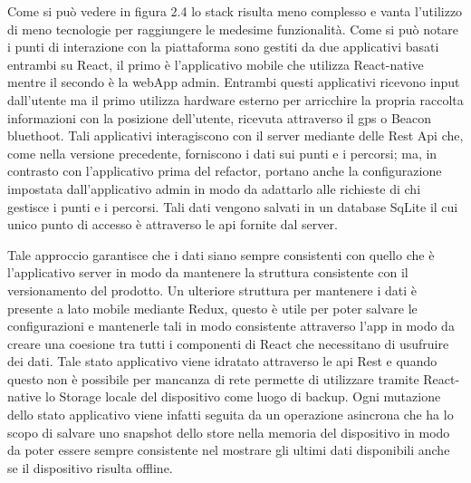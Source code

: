 \vspace{5mm}Come si può vedere in figura 2.4 lo stack risulta meno complesso e vanta l'utilizzo di meno tecnologie per raggiungere le medesime funzionalità. Come si può notare i punti di interazione con la piattaforma sono gestiti da due applicativi basati entrambi su React, il primo è l'applicativo mobile che utilizza React-native mentre il secondo è la webApp admin. Entrambi questi applicativi ricevono input dall'utente ma il primo utilizza hardware esterno per arricchire la propria raccolta informazioni con la posizione dell'utente, ricevuta attraverso il gps o Beacon bluethoot. Tali applicativi interagiscono con il server mediante delle Rest Api che, come nella versione precedente, forniscono i dati sui punti e i percorsi; ma, in contrasto con l'applicativo prima del refactor, portano anche la configurazione impostata dall'applicativo admin in modo da adattarlo alle richieste di chi gestisce i punti e i percorsi. Tali dati vengono salvati in un database SqLite il cui unico punto di accesso è attraverso le api fornite dal server. \vspace{5mm}

Tale approccio garantisce che i dati siano sempre consistenti con quello che è l'applicativo server in modo da mantenere la struttura consistente con il versionamento del prodotto. Un ulteriore struttura per mantenere i dati è presente a lato mobile mediante Redux, questo è utile per poter salvare le configurazioni e mantenerle tali in modo consistente attraverso l'app in modo da creare una coesione tra tutti i componenti di React che necessitano di usufruire dei dati. Tale stato applicativo viene idratato attraverso le api Rest e quando questo non è possibile per mancanza di rete permette di utilizzare tramite React-native lo Storage locale del dispositivo come luogo di backup. Ogni mutazione dello stato applicativo viene infatti seguita da un operazione asincrona che ha lo scopo di salvare uno snapshot dello store nella memoria del dispositivo in modo da poter essere sempre consistente nel mostrare gli ultimi dati disponibili anche se il dispositivo risulta offline.\vspace{5mm}



